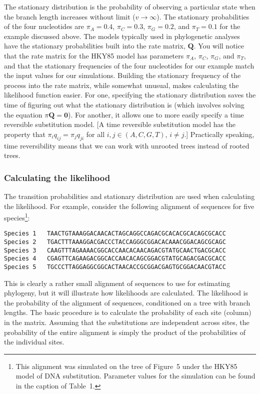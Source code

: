 \documentclass{svmult}
\begin{document}
The stationary distribution is the probability of observing a particular state when the branch length increases without limit
($v \rightarrow \infty$). The stationary probabilities of the four nucleotides are $\pi_A = 0.4$, $\pi_C = 0.3$, $\pi_G = 0.2$,
and $\pi_T = 0.1$ for the example discussed above. The models typically used in phylogenetic analyses have the stationary
probabilities built into the rate matrix, ${\mathbf Q}$. You will notice that the rate matrix for the HKY85
model has parameters $\pi_A$, $\pi_C$, $\pi_G$, and $\pi_T$, and that the stationary frequencies of the four nucleotides
for our example match the input values for our simulations. Building the stationary frequency of the process into the
rate matrix, while somewhat unusual, makes calculating the likelihood function easier. For one, specifying the stationary
distribution saves the time of figuring out what the stationary distribution is (which involves solving the equation
$\pi {\mathbf Q} = {\mathbf 0}$). For another, it allows one to more easily specify  a time reversible substitution model.
[A time reversible substitution model has the property that $\pi_i q_{ij} = \pi_j q_{ji}$ for all $i, j \in (A,C,G,T)$, $i \neq j$.]
Practically speaking, time reversibility means that we can work with unrooted trees instead of rooted trees.

\subsubsection{Calculating the likelihood} The transition probabilities and stationary distribution are used when calculating
the likelihood. For example, consider the following alignment of sequences for five species\footnote{This alignment was simulated on the tree of Figure~5 under the HKY85 model of DNA substitution. Parameter values for
the simulation can be found in the caption of Table~1.}:
\begin{verbatim}
Species 1   TAACTGTAAAGGACAACACTAGCAGGCCAGACGCACACGCACAGCGCACC
Species 2   TGACTTTAAAGGACGACCCTACCAGGGCGGACACAAACGGACAGCGCAGC
Species 3   CAAGTTTAGAAAACGGCACCAACACAACAGACGTATGCAACTGACGCACC
Species 4   CGAGTTCAGAAGACGGCACCAACACAGCGGACGTATGCAGACGACGCACC
Species 5   TGCCCTTAGGAGGCGGCACTAACACCGCGGACGAGTGCGGACAACGTACC
\end{verbatim}
This is clearly a rather small alignment of sequences to use for estimating phylogeny, but it will illustrate
how likelihoods are calculated. The likelihood is the probability of the alignment of sequences, conditioned on a tree
with branch lengths. The basic procedure is to calculate the probability of each site (column) in the matrix. Assuming that
the substitutions are independent across sites, the probability of the entire alignment is simply the product of the probabilities
of the individual sites. 
\end{document}
